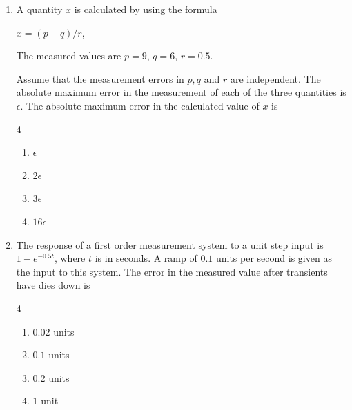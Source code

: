 \documentclass[journal,12pt,onecolumn]{IEEEtran}
\theoremstyle{remark}
\begin{document}
\begin{enumerate}
\vspace{0.5cm}
\item A quantity $x$ is calculated by using the formula\par
$x=(p-q)/r$,\par
The measured values are $p=9$, $q=6$, $r=0.5$.\par
Assume that the measurement errors in $p,q$ and $r$ are independent. The absolute maximum error in the measurement of each of the three quantities is $\epsilon$. The absolute maximum error in the calculated value of $x$ is \par \hfill{}
\begin{multicols}{4}
    \begin{enumerate}
        \item $\epsilon$
        \item $2\epsilon$
        \item $3\epsilon$
        \item $16\epsilon$
\end{enumerate}
\end{multicols}

\vspace{0.5cm}
\item The response of a first order measurement system to a unit step input is $1-e^{-0.5t}$, where $t$ is in seconds. A ramp of $0.1$ units per second is given as the input to this system. The error in the measured value after transients have dies down is \par \hfill{}
\begin{multicols}{4}
    \begin{enumerate}
        \item $0.02$ units
        \item $0.1$ units
        \item $0.2$ units
        \item $1$ unit
\end{enumerate}
\end{multicols}


\end{enumerate}
\end{document}
